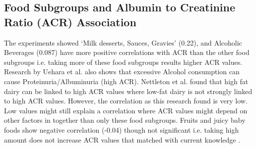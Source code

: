 \subsection*{Food Subgroups and Albumin to Creatinine Ratio (ACR) Association}
The experiments showed  `Milk desserts, Sauces, Gravies' (0.22), and Alcoholic Beverages (0.087) have more positive correlations with ACR than the other food subgroups  i.e. taking more of these food subgroups results higher ACR values. Research by Uehara et al. \cite{Ueharaetal2016} also shows that excessive Alcohol consumption can cause Proteinuria/Albuminuria (high ACR). Nettleton et al. \cite{Nettletonetal2008} found that high fat dairy can be linked to high ACR values where low-fat dairy is not strongly linked to high ACR values. However, the correlation as this research found is very low. Low values might still explain a correlation where ACR values might depend on other factors in together than only these food subgroups. Fruits and juicy baby foods show negative correlation (-0.04) though not significant i.e. taking high amount does not increase ACR values that matched with current knowledge \cite{Jacobsetal2009}.
